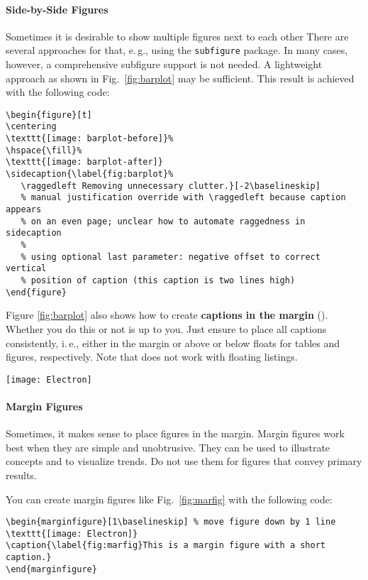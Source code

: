 \paragraph{Side-by-Side Figures} Sometimes it is desirable to show multiple figures next to each other There are several approaches for that, e.\,g., using the \texttt{subfigure} package. In many cases, however, a comprehensive subfigure support is not needed. A lightweight approach as shown in Fig.~\ref{fig:barplot} may be sufficient. This result is achieved with the following code:
\begin{lstlisting}[language={[LaTeX]TeX}]
\begin{figure}[t]
\centering
\texttt{[image: barplot-before]}%
\hspace{\fill}%
\texttt{[image: barplot-after]}
\sidecaption{\label{fig:barplot}%
   \raggedleft Removing unnecessary clutter.}[-2\baselineskip]
   % manual justification override with \raggedleft because caption appears
   % on an even page; unclear how to automate raggedness in sidecaption
   % 
   % using optional last parameter: negative offset to correct vertical
   % position of caption (this caption is two lines high)
\end{figure}
\end{lstlisting}

Figure \ref{fig:barplot} also shows how to create \textbf{captions in the margin} (). Whether you do this or not is up to you.
Just ensure to place all captions consistently, i.\,e., either in the margin or above or below floats for tables and figures, respectively. Note that  does not work with floating listings.


\begin{marginfigure}[1\baselineskip] %
\texttt{[image: Electron]}
\caption{\label{fig:marfig}This is a margin figure with a short caption.}
\end{marginfigure}

\paragraph{Margin Figures} Sometimes, it makes sense to place figures in the margin. Margin figures work best when they are simple and unobtrusive. They can be used to illustrate concepts and to visualize trends. Do not use them for figures that convey primary results.

You can create margin figures like Fig.~\ref{fig:marfig} with the following code:
\begin{lstlisting}[language={[LaTeX]TeX}]
\begin{marginfigure}[1\baselineskip] % move figure down by 1 line 
\texttt{[image: Electron]}
\caption{\label{fig:marfig}This is a margin figure with a short caption.}
\end{marginfigure}
\end{lstlisting}


